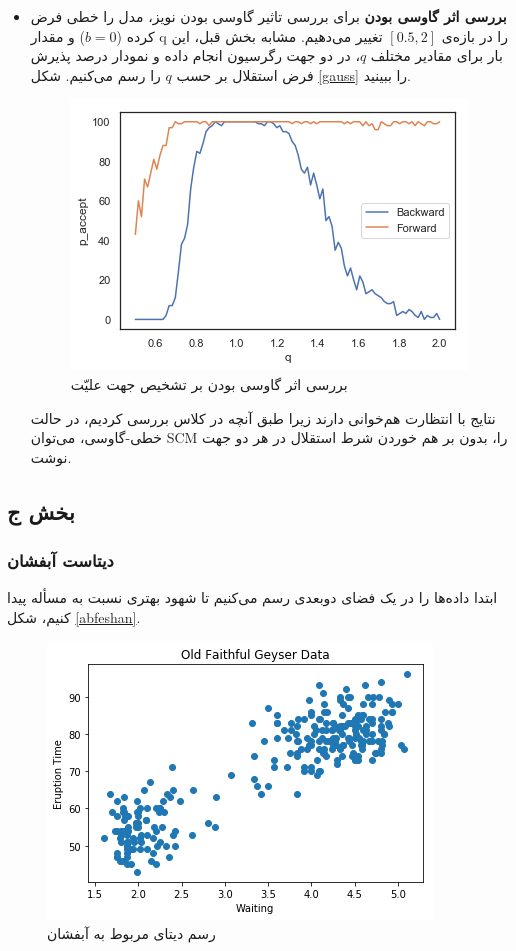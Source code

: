 \documentclass{article}
\begin{document}
\begin{itemize}
\item \textbf{بررسی اثر گاوسی بودن} 
برای بررسی تاثیر گاوسی بودن نویز، مدل را خطی فرض کرده 
($b=0$)
و مقدار q را در بازه‌ی 
$[0.5, 2]$
تغییر می‌دهیم. مشابه بخش قبل، این بار برای مقادیر مختلف $q$، در دو جهت رگرسیون انجام داده و نمودار درصد پذیرش فرض استقلال بر حسب $q$ را رسم می‌کنیم. شکل
\eqref{gauss}
را ببینید.
\begin{figure}[h!]
	\includegraphics[scale=0.45]{gauss.png}
	\caption{بررسی اثر گاوسی بودن بر تشخیص جهت علیّت}
	\label{gauss}
\end{figure}


نتایج با انتظارت هم‌خوانی دارند زیرا طبق آنچه در کلاس بررسی کردیم، در حالت خطی-گاوسی، می‌توان SCM را، بدون بر هم خوردن شرط استقلال در هر دو جهت نوشت.
\end{itemize}
	
	
	
	
\newpage
\subsection{بخش ج}
\subsubsection{دیتاست آبفشان}

ابتدا داده‌ها را در یک فضای دو‌بعدی رسم می‌کنیم تا شهود بهتری نسبت به مسأله پیدا کنیم، شکل \eqref{abfeshan}.
\begin{figure}[h]
\centering
\includegraphics[scale=0.45]{old1.png}
\caption{رسم دیتای مربوط به آبفشان}
\label{abfeshan}
\end{figure}
\end{document}
